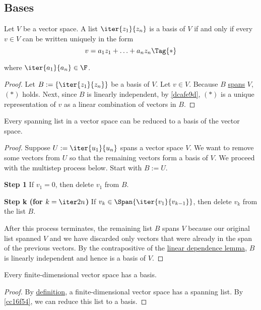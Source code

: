 \subsection{Bases}\label{ccca984}

\label{ed4c0d8}

Let $V$ be a vector space. A list $\iter{z_1}{z_n}$ is a basis of $V$ if and
only if every $v\in V$ can be written uniquely in the form
\begin{equation*}
  v=a_1z_1+\ldots+a_nz_n\Tag{*}
\end{equation*}

where $\iter{a_1}{a_n}\in\F$.

\begin{proof}
  Let $B:=\{\iter{z_1}{z_n}\}$ be a basis of $V$. Let $v\in V$. Because $B$
  \href{ac574be}{spans} $V$, $(*)$ holds. Next, since $B$ is linearly
  independent, by \autoref{dcafe9d}, $(*)$ is a unique representation of $v$ as
  a linear combination of vectors in $B$.
\end{proof}

\label{cc16f54}

Every spanning list in a vector space can be reduced to a basis of the vector
space.

\begin{proof}
  Suppose $U:=\iter{u_1}{u_n}$ spans a vector space $V$. We want to remove some
  vectors from $U$ so that the remaining vectors form a basis of $V$. We proceed
  with the multistep process below.
  Start with $B:=U$.

  \textbf{Step 1} If $v_1=0$, then delete $v_1$ from $B$.

  \textbf{Step k (for $k=\iter2n$)} If $v_k\in\Span\{\iter{v_1}{v_{k-1}}\}$,
  then delete $v_k$ from the list $B$.

  After this process terminates, the remaining list $B$ spans $V$ because our
  original list spanned $V$ and we have discarded only vectors that were
  already in the span of the previous vectors. By the contrapositive of the
  \href{ba96a6f}{linear dependence lemma}, $B$ is linearly independent and
  hence is a basis of $V$.
\end{proof}

\label{e3f4034}

Every finite-dimensional vector space has a basis.

\begin{proof}
  By \href{c4cd6dd}{definition},  a finite-dimensional vector space has a
  spanning list. By \autoref{cc16f54}, we can reduce this list to a basis.
\end{proof}

